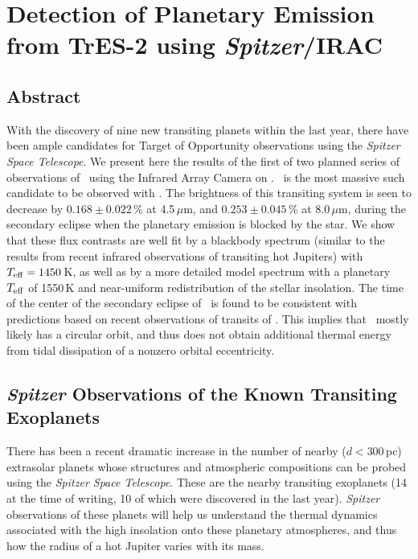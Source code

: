 \chapter[Detection of Planetary Emission from TrES-2 using \emph{Spitzer}/ IRAC]
{%
Detection of Planetary Emission from TrES-2 using \emph{Spitzer}/IRAC%
\protect\CFNE%
}
\label{cha:spitzer}

\section*{Abstract}
\label{cha:spitzer:sec:abs}

With the discovery of nine new transiting planets within the last year, there have been ample candidates for Target of Opportunity observations using the {\it Spitzer Space Telescope}.
We present here the results of the first of two planned series of observations of \tresTwo\ using the Infrared Array Camera on \spi.
\tresTwo\ is the most massive such candidate to be observed with \spi.
The brightness of this transiting system is seen to decrease by \mbox{$0.168 \pm 0.022$\,\%} at 4.5\,$\mu$m, and \mbox{$0.253 \pm 0.045$\,\%} at 8.0\,$\mu$m, during the secondary eclipse when the planetary emission is blocked by the star.
We show that these flux contrasts are well fit by a blackbody spectrum (similar to the results from recent infrared observations of transiting hot Jupiters) with \mbox{$T_{\rm eff}=1450$\,K}, as well as by a more detailed model spectrum with a planetary $T_{\rm eff}$ of 1550\,K and near-uniform redistribution of the stellar insolation.
The time of the center of the secondary eclipse of \tresTwo\ is found to be consistent with predictions based on recent observations of transits of \tresTwo.
This implies that \tresTwo\ mostly likely has a circular orbit, and thus does not obtain additional thermal energy from tidal dissipation of a nonzero orbital eccentricity.

\section[\textit{Spitzer} Observations of the Known Transiting Exoplanets]{\textbf{\textit{Spitzer}} Observations of the Known Transiting Exoplanets}
\label{cha:spitzer:sec:intro}

There has been a recent dramatic increase in the number of nearby ($d<300$\,pc) extrasolar planets whose structures and atmospheric compositions can be probed using the {\it Spitzer Space Telescope}.
These are the nearby transiting exoplanets (14 at the time of writing, 10 of which were discovered in the last year).
{\it Spitzer} observations of these planets will help us understand the thermal dynamics associated with the high insolation onto these planetary atmospheres, and thus how the radius of a hot Jupiter varies with its mass.

